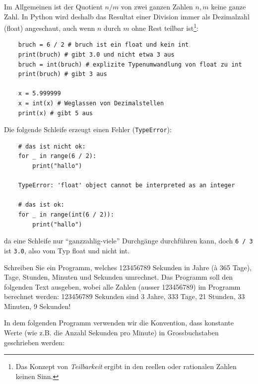 \begin{myattention}\label{myattention:float_not_int}
	Im Allgemeinen ist der Quotient $n / m$ von zwei ganzen Zahlen $n, m$ keine ganze Zahl. In Python wird deshalb das Resultat einer Division immer als Dezimalzahl (float) angeschaut, auch wenn $n$ durch $m$ ohne Rest teilbar ist\footnote{Das Konzept von \emph{Teilbarkeit} ergibt in den reellen oder rationalen Zahlen keinen Sinn.}:
	\begin{lstlisting}
	bruch = 6 / 2 # bruch ist ein float und kein int
	print(bruch) # gibt 3.0 und nicht etwa 3 aus
	bruch = int(bruch) # explizite Typenumwandlung von float zu int
	print(bruch) # gibt 3 aus

	x = 5.999999 
	x = int(x) # Weglassen von Dezimalstellen
	print(x) # gibt 5 aus
	\end{lstlisting}
	Die folgende Schleife erzeugt einen Fehler (\texttt{TypeError}):
	\begin{lstlisting}
	# das ist nicht ok:
	for _ in range(6 / 2):
		print("hallo")

	TypeError: 'float' object cannot be interpreted as an integer
	
	# das ist ok:
	for _ in range(int(6 / 2)):
		print("hallo")
	\end{lstlisting}
	da eine Schleife nur \enquote{ganzzahlig-viele} Durchgänge durchführen kann, doch \texttt{6 / 3} ist \texttt{3.0}, also vom Typ float und nicht int.
\end{myattention}


\begin{mychallenge}\label{ex:sToY}
	Schreiben Sie ein Programm, welches 123456789 Sekunden in Jahre (à 365 Tage), Tage, Stunden, Minuten und Sekunden umrechnet.
	Das Programm soll den folgenden Text ausgeben, wobei alle Zahlen (ausser 123456789) im Programm berechnet werden: 123456789 Sekunden sind 3 Jahre, 333 Tage, 21 Stunden, 33 Minuten, 9 Sekunden!
	\begin{myanswer}
		In dem folgenden Programm verwenden wir die Konvention, dass konstante Werte (wie z.B. die Anzahl Sekunden pro Minute) in Grossbuchstaben geschrieben werden:
		
	\end{myanswer}
\end{mychallenge}

